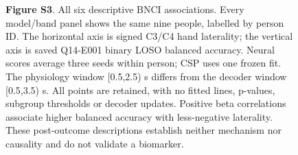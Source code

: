 \documentclass[11pt]{article}
\begin{document}
\begin{figure}[htbp]
{
}
\caption*{\textbf{Figure S3}. All six descriptive BNCI associations. Every model/band panel shows the same nine people, labelled by person ID. The horizontal axis is signed C3/C4 hand laterality; the vertical axis is saved Q14-E001 binary LOSO balanced accuracy. Neural scores average three seeds within person; CSP uses one frozen fit. The physiology window [0.5,2.5) s differs from the decoder window [0.5,3.5) s. All points are retained, with no fitted lines, p-values, subgroup thresholds or decoder updates. Positive beta correlations associate higher balanced accuracy with less-negative laterality. These post-outcome descriptions establish neither mechanism nor causality and do not validate a biomarker.}
\end{figure}
\end{document}
